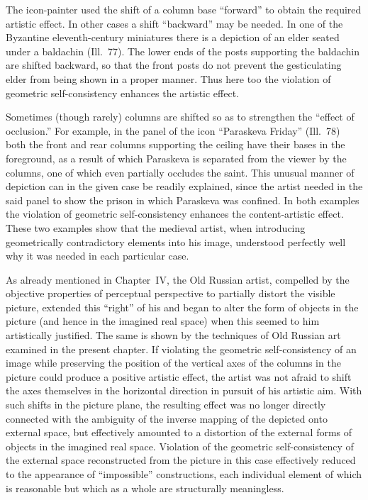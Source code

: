 The icon-painter used the shift of a column base ``forward'' to obtain the required
artistic effect.  In other cases a shift ``backward'' may be needed.  In one of the
Byzantine eleventh-century miniatures there is a depiction of an elder seated under a
baldachin (Ill.~77).  The lower ends of the posts supporting the baldachin are shifted
backward, so that the front posts do not prevent the gesticulating elder from being shown
in a proper manner.  Thus here too the violation of geometric self-consistency enhances
the artistic effect.



Sometimes (though rarely) columns are shifted so as to strengthen the ``effect of
occlusion.''  For example, in the panel of the icon ``Paraskeva Friday'' (Ill.~78) both
the front and rear columns supporting the ceiling have their bases in the foreground, as
a result of which Paraskeva is separated from the viewer by the columns, one of which
even partially occludes the saint.  This unusual manner of depiction can in the given
case be readily explained, since the artist needed in the said panel to show the prison
in which Paraskeva was confined.  In both examples the violation of geometric
self-consistency enhances the content-artistic effect.  These two examples show that the
medieval artist, when introducing geometrically contradictory elements into his image,
understood perfectly well why it was needed in each particular case.

As already mentioned in Chapter~IV, the Old Russian artist, compelled by the objective
properties of perceptual perspective to partially distort the visible picture, extended
this ``right'' of his and began to alter the form of objects in the picture (and hence
in the imagined real space) when this seemed to him artistically justified.  The same is
shown by the techniques of Old Russian art examined in the present chapter.  If violating
the geometric self-consistency of an image while preserving the position of the vertical
axes of the columns in the picture could produce a positive artistic effect, the artist
was not afraid to shift the axes themselves in the horizontal direction in pursuit of his
artistic aim.  With such shifts in the picture plane, the resulting effect was no longer
directly connected with the ambiguity of the inverse mapping of the depicted onto external
space, but effectively amounted to a distortion of the external forms of objects in the
imagined real space.  Violation of the geometric self-consistency of the external space
reconstructed from the picture in this case effectively reduced to the appearance of
``impossible'' constructions, each individual element of which is reasonable but which
as a whole are structurally meaningless.

